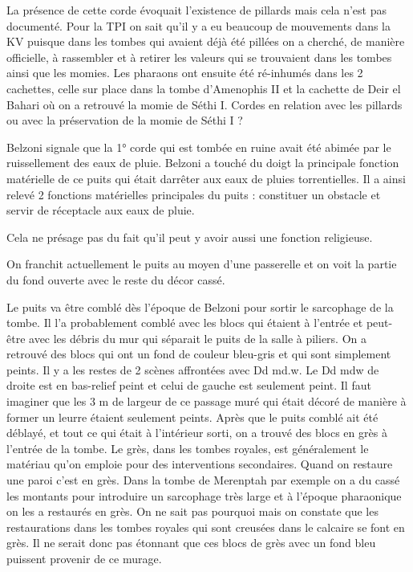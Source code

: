 \documentclass{article}
\begin{document}
La présence de cette corde évoquait l’existence de pillards mais cela
n’est pas documenté. Pour la TPI on sait qu’il y a eu beaucoup de
mouvements dans la KV puisque dans les tombes qui avaient déjà été
pillées on a cherché, de manière officielle,  à rassembler et à retirer
les valeurs qui se trouvaient dans les tombes ainsi que les momies. Les
pharaons ont ensuite été ré-inhumés dans les 2 cachettes, celle sur
place dans la tombe d’Amenophis II et la cachette de Deir el Bahari où
on a retrouvé la momie de Séthi I. Cordes en relation avec les pillards
ou avec la préservation de la momie de Séthi I ?

Belzoni signale que la 1° corde qui est tombée en ruine avait été abimée
par le ruissellement des eaux de pluie. Belzoni a touché du doigt la
principale fonction matérielle de ce puits qui était
d{\textquotesingle}arrêter aux eaux de pluies torrentielles. Il a ainsi
relevé 2 fonctions matérielles principales du puits : constituer un
obstacle et servir de réceptacle aux eaux de pluie.

Cela ne présage pas du fait qu’il peut y avoir aussi une fonction
religieuse.

On franchit actuellement le puits au moyen d’une passerelle et on voit
la partie du fond ouverte avec le reste du décor cassé. 

Le puits va être comblé dès l’époque de Belzoni pour sortir le
sarcophage de la tombe. Il l’a probablement comblé avec les blocs qui
étaient à l’entrée et peut-être avec les débris du mur qui séparait le
puits de la salle à piliers. On a retrouvé des blocs qui ont un fond de
couleur bleu-gris et qui sont simplement peints. Il y a les restes de 2
scènes affrontées avec Dd md.w. Le Dd mdw de droite est en bas-relief
peint et celui de gauche est seulement peint. Il faut imaginer que les
3 m de largeur de ce passage muré qui était décoré de manière à former
un leurre étaient seulement peints. Après que le puits comblé ait été
déblayé, et tout ce qui était à l’intérieur sorti, on a trouvé des
blocs en grès à l’entrée de la tombe. Le grès, dans les tombes royales,
est généralement le matériau qu’on emploie pour des interventions
secondaires. Quand on restaure une paroi c’est en grès. Dans la tombe
de Merenptah par exemple on a du cassé les montants pour introduire un
sarcophage très large et à l’époque pharaonique on les a restaurés en
grès. On ne sait pas pourquoi mais on constate que les restaurations
dans les tombes royales qui sont creusées dans le calcaire se font en
grès. Il ne serait donc pas étonnant que ces blocs de grès avec un fond
bleu puissent provenir de ce murage. 
\end{document}
